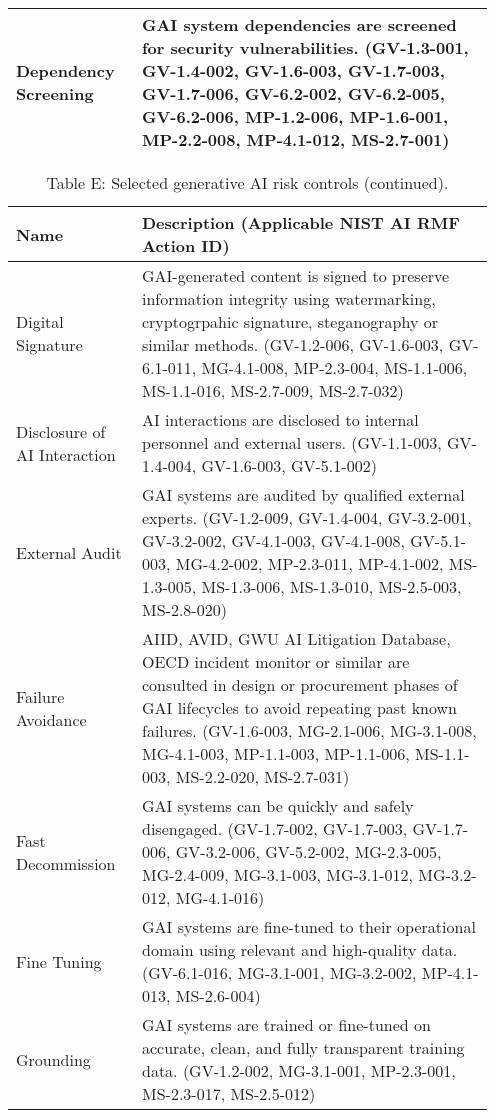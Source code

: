 \documentclass[fleqn]{article}
\begin{document}
\begin{table}[H]
\begin{tabular}{|m{0.25\linewidth} |m{0.70\linewidth} |}
		\hline
		Dependency Screening  & GAI system dependencies are screened for security vulnerabilities. (GV-1.3-001, GV-1.4-002, GV-1.6-003, GV-1.7-003, GV-1.7-006, GV-6.2-002, GV-6.2-005, GV-6.2-006, MP-1.2-006, MP-1.6-001, MP-2.2-008, MP-4.1-012, MS-2.7-001) \\ 
		\hline
	\end{tabular}
\end{table}		
\pagebreak	
		
\begin{table}[H]
	\caption*{Table E: Selected generative AI risk controls (continued).}
	\label{tab:controls_cont}
	\footnotesize
	\begin{tabular}{|m{0.25\linewidth} |m{0.70\linewidth} |}
		\hline
		\textbf{Name} & \textbf{Description} (Applicable NIST AI RMF Action ID) \\
		\hline		
		Digital Signature & GAI-generated content is signed to preserve information integrity using watermarking, cryptogrpahic signature, steganography or similar methods. (GV-1.2-006, GV-1.6-003, GV-6.1-011, MG-4.1-008, MP-2.3-004, MS-1.1-006, MS-1.1-016, MS-2.7-009, MS-2.7-032) \\ 
		\hline
		Disclosure of AI Interaction & AI interactions are disclosed to internal personnel and external users. (GV-1.1-003, GV-1.4-004, GV-1.6-003, GV-5.1-002) \\ 
		\hline
		External Audit & GAI systems are audited by qualified external experts. (GV-1.2-009, GV-1.4-004, GV-3.2-001, GV-3.2-002, GV-4.1-003, GV-4.1-008, GV-5.1-003, MG-4.2-002, MP-2.3-011, MP-4.1-002, MS-1.3-005, MS-1.3-006, MS-1.3-010, MS-2.5-003, MS-2.8-020) \\ 
		\hline
		Failure Avoidance & AIID, AVID, GWU AI Litigation Database, OECD incident monitor or similar are consulted in design or procurement phases of GAI lifecycles to avoid repeating past known failures. (GV-1.6-003, MG-2.1-006, MG-3.1-008, MG-4.1-003, MP-1.1-003, MP-1.1-006, MS-1.1-003, MS-2.2-020, MS-2.7-031) \\ \hline
		Fast Decommission & GAI systems can be quickly and safely disengaged. (GV-1.7-002, GV-1.7-003, GV-1.7-006, GV-3.2-006, GV-5.2-002, MG-2.3-005, MG-2.4-009, MG-3.1-003, MG-3.1-012, MG-3.2-012, MG-4.1-016) \\
		\hline		
		Fine Tuning & GAI systems are fine-tuned to their operational domain using relevant and high-quality data. (GV-6.1-016, 	MG-3.1-001, MG-3.2-002, MP-4.1-013, MS-2.6-004) \\ 
		\hline
		Grounding & GAI systems are trained or fine-tuned on accurate, clean, and fully transparent training data. (GV-1.2-002, MG-3.1-001, MP-2.3-001, MS-2.3-017, MS-2.5-012) \\ 

\end{tabular}
\end{table}
\end{document}
